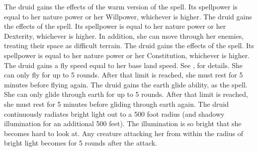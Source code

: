      The druid gains the effects of the warm version of the  spell.
    Its spellpower is equal to her nature power or her Willpower, whichever is higher.
     The druid gains the effects of the  spell.
    Its spellpower is equal to her nature power or her Dexterity, whichever is higher.
    In addition, she can move through her enemies, treating their space as difficult terrain.
     The druid gains the effects of the  spell.
    Its spellpower is equal to her nature power or her Constitution, whichever is higher.
     The druid gains a fly speed equal to her base land speed.
    See , for details.
    She can only fly for up to 5 rounds.
    After that limit is reached, she must rest for 5 minutes before flying again.
    The druid gains the earth glide ability, as the  spell.
    She can only glide through earth for up to 5 rounds.
    After that limit is reached, she must rest for 5 minutes before gliding through earth again.
    The druid continuously radiates bright light out to a 500 foot radius (and shadowy illumination for an additional 500 feet).
    The illumination is so bright that she becomes hard to look at.
    Any creature attacking her from within the radius of bright light becomes \partiallyblinded for 5 rounds after the attack.

